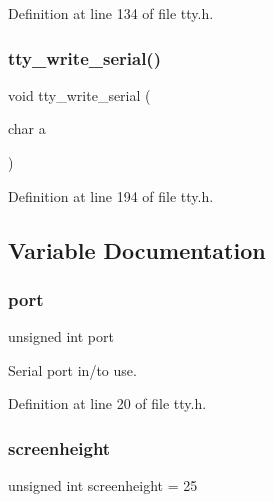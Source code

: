 Definition at line 134 of file tty.\+h.

\mbox{\label{a00035_a6439cc460585c2ec3c50b390a4b4b250_a6439cc460585c2ec3c50b390a4b4b250}} 
\subsubsection{\texorpdfstring{tty\+\_\+write\+\_\+serial()}{tty\_write\_serial()}}
{\footnotesize\ttfamily void tty\+\_\+write\+\_\+serial (\begin{DoxyParamCaption}\item[{char}]{a }\end{DoxyParamCaption})}



Definition at line 194 of file tty.\+h.



\subsection{Variable Documentation}
\mbox{\label{a00035_a938bdc6ae46c346147b6d4f67ad1e704_a938bdc6ae46c346147b6d4f67ad1e704}} 
\subsubsection{\texorpdfstring{port}{port}}
{\footnotesize\ttfamily unsigned int port}



Serial port in/to use. 



Definition at line 20 of file tty.\+h.

\mbox{\label{a00035_ab8b80ea0ba671319c70e7a9207589648_ab8b80ea0ba671319c70e7a9207589648}} 
\subsubsection{\texorpdfstring{screenheight}{screenheight}}
{\footnotesize\ttfamily unsigned int screenheight = 25}



